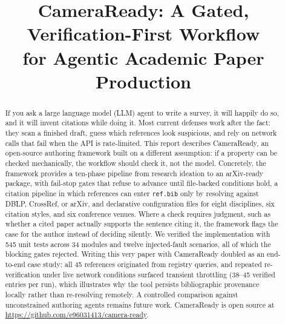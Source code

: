 \documentclass[conference]{IEEEtran}
\begin{document}
\title{CameraReady: A Gated, Verification-First Workflow\\for Agentic Academic Paper Production}

\author{
}

\maketitle

\begin{abstract}
If you ask a large language model (LLM) agent to write a survey, it will happily do so, and it will invent citations while doing it. Most current defenses work after the fact: they scan a finished draft, guess which references look suspicious, and rely on network calls that fail when the API is rate-limited. This report describes CameraReady, an open-source authoring framework built on a different assumption: if a property can be checked mechanically, the workflow should check it, not the model. Concretely, the framework provides a ten-phase pipeline from research ideation to an arXiv-ready package, with fail-stop gates that refuse to advance until file-backed conditions hold, a citation pipeline in which references can enter \texttt{ref.bib} only by resolving against DBLP, CrossRef, or arXiv, and declarative configuration files for eight disciplines, six citation styles, and six conference venues. Where a check requires judgment, such as whether a cited paper actually supports the sentence citing it, the framework flags the case for the author instead of deciding silently. We verified the implementation with 545 unit tests across 34 modules and twelve injected-fault scenarios, all of which the blocking gates rejected. Writing this very paper with CameraReady doubled as an end-to-end case study: all 45 references originated from registry queries, and repeated re-verification under live network conditions surfaced transient throttling (38--45 verified entries per run), which illustrates why the tool persists bibliographic provenance locally rather than re-resolving remotely. A controlled comparison against unconstrained authoring agents remains future work. CameraReady is open source at \url{https://github.com/e96031413/camera-ready}.
\end{abstract}
\end{document}
